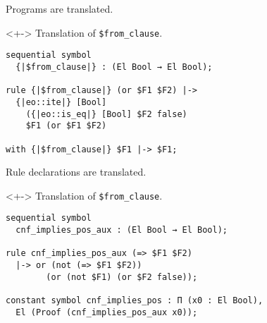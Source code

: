 \documentclass[lualatex, compress, 12pt, handout]{beamer}
\begin{document}
\begin{frame}[fragile]
	Programs are translated.\\[2mm]
	\begin{uncoverenv}<+->%
		\exxample Translation of \texttt{\$from\_clause}.
		\begin{lstlisting}
sequential symbol
  {|$from_clause|} : (El Bool → El Bool);

rule {|$from_clause|} (or $F1 $F2) |->
  {|eo::ite|} [Bool]
    ({|eo::is_eq|} [Bool] $F2 false)
    $F1 (or $F1 $F2)

with {|$from_clause|} $F1 |-> $F1;\end{lstlisting}
	\end{uncoverenv}
\end{frame}

\begin{frame}[fragile]
	Rule declarations are translated.\\[2mm]
	\begin{uncoverenv}<+->%
		\exxample Translation of \texttt{\$from\_clause}.
		\begin{lstlisting}
sequential symbol
  cnf_implies_pos_aux : (El Bool → El Bool);

rule cnf_implies_pos_aux (=> $F1 $F2)
  |-> or (not (=> $F1 $F2))
        (or (not $F1) (or $F2 false));

constant symbol cnf_implies_pos : Π (x0 : El Bool),
  El (Proof (cnf_implies_pos_aux x0));\end{lstlisting}
	\end{uncoverenv}
\end{frame}
\end{document}
